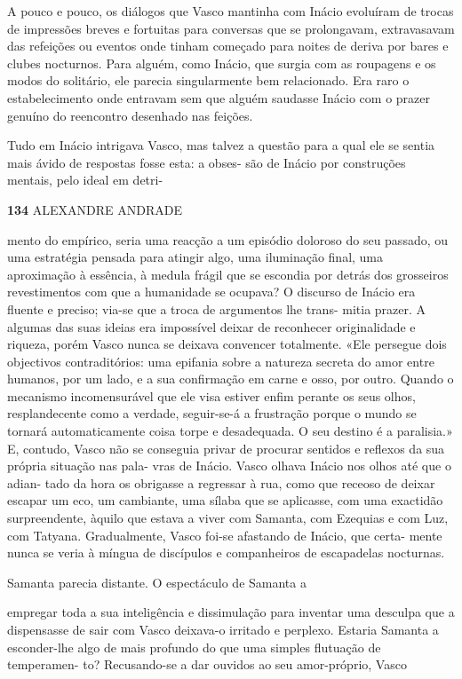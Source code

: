 A pouco e pouco, os diálogos que Vasco mantinha com Inácio evoluíram de
trocas de impressões breves e fortuitas para conversas que se
prolongavam, extravasavam das refeições ou eventos onde tinham começado
para noites de deriva por bares e clubes nocturnos. Para alguém, como
Inácio, que surgia com as roupagens e os modos do solitário, ele parecia
singularmente bem relacionado. Era raro o estabelecimento onde entravam
sem que alguém saudasse Inácio com o prazer genuíno do reencontro
desenhado nas feições.

Tudo em Inácio intrigava Vasco, mas talvez a questão para a qual ele se
sentia mais ávido de respostas fosse esta: a obses- são de Inácio por
construções mentais, pelo ideal em detri-

\textbf{134 }ALEXANDRE ANDRADE

mento do empírico, seria uma reacção a um episódio doloroso do seu
passado, ou uma estratégia pensada para atingir algo, uma iluminação
final, uma aproximação à essência, à medula frágil que se escondia por
detrás dos grosseiros revestimentos com que a humanidade se ocupava? O
discurso de Inácio era fluente e preciso; via-se que a troca de
argumentos lhe trans- mitia prazer. A algumas das suas ideias era
impossível deixar de reconhecer originalidade e riqueza, porém Vasco
nunca se deixava convencer totalmente. «Ele persegue dois objectivos
contraditórios: uma epifania sobre a natureza secreta do amor entre
humanos, por um lado, e a sua confirmação em carne e osso, por outro.
Quando o mecanismo incomensurável que ele visa estiver enfim perante os
seus olhos, resplandecente como a verdade, seguir-se-á a frustração
porque o mundo se tornará automaticamente coisa torpe e desadequada. O
seu destino é a paralisia.» E, contudo, Vasco não se conseguia privar de
procurar sentidos e reflexos da sua própria situação nas pala- vras de
Inácio. Vasco olhava Inácio nos olhos até que o adian- tado da hora os
obrigasse a regressar à rua, como que receoso de deixar escapar um eco,
um cambiante, uma sílaba que se aplicasse, com uma exactidão
surpreendente, àquilo que estava a viver com Samanta, com Ezequias e com
Luz, com Tatyana. Gradualmente, Vasco foi-se afastando de Inácio, que
certa- mente nunca se veria à míngua de discípulos e companheiros de
escapadelas nocturnas.

Samanta parecia distante. O espectáculo de Samanta a

empregar toda a sua inteligência e dissimulação para inventar uma
desculpa que a dispensasse de sair com Vasco deixava-o irritado e
perplexo. Estaria Samanta a esconder-lhe algo de mais profundo do que
uma simples flutuação de temperamen- to? Recusando-se a dar ouvidos ao
seu amor-próprio, Vasco

